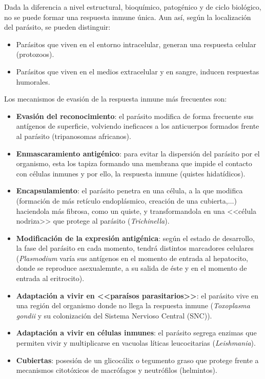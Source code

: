 Dada la diferencia a nivel estructural, bioquímico, patogénico y de ciclo biológico, no se puede formar una respuesta inmune única. Aun así, según la localización del parásito, se pueden distinguir:
\begin{itemize}[itemsep=0pt,parsep=0pt,topsep=0pt,partopsep=0pt]
	\item Parásitos que viven en el entorno intracelular, generan una respuesta celular (protozoos).
	\item Parásitos que viven en el medios extracelular y en sangre, inducen respuestas humorales.
\end{itemize}

Los mecanismos de evasión de la respuesta inmune más frecuentes son:
\begin{itemize}[itemsep=0pt,parsep=0pt,topsep=0pt,partopsep=0pt]
	\item \textbf{Evasión del reconocimiento}: el parásito modifica de forma frecuente sus antígenos de superficie, volviendo ineficaces a los anticuerpos formados frente al parásito (tripanosomas africanos).
	\item\textbf{Enmascaramiento antigénico}: para evitar la dispersión del parásito por el organismo, esta los tapiza formando una membrana que impide el contacto con células inmunes y por ello, la respuesta inmune (quistes hidatídicos).
	\item\textbf{Encapsulamiento}: el parásito penetra en una célula, a la que modifica (formación de más retículo endoplásmico, creación de una cubierta,$\dots$) haciendola más fibrosa, como un quiste, y transformandola en una <<célula nodriza>> que protege al parásito (\textit{Trichinella}).
	\item\textbf{Modificación de la expresión antigénica}: según el estado de desarrollo, la fase del parásito en cada momento, tendrá distintos marcadores celulares (\textit{Plasmodium} varía sus antígenos en el momento de entrada al hepatocito, donde se reproduce asexualemnte, a su salida de éste y en el momento de entrada al eritrocito).
	\item\textbf{Adaptación a vivir en <<paraísos parasitarios>>}: el parásito vive en una región del organismo donde no llega la respuesta inmune (\textit{Toxoplasma gondii} y su colonización del Sistema Nervioso Central (SNC)).
	\item\textbf{Adaptación a vivir en células inmunes}: el parásito segrega enzimas que permiten vivir y multiplicarse en vacuolas líticas leucocitarias (\textit{Leishmania}).
	\item\textbf{Cubiertas}: posesión de un glicocálix o tegumento graso que protege frente a mecanismos citotóxicos de macrófagos y neutrófilos (helmintos).
\end{itemize}
